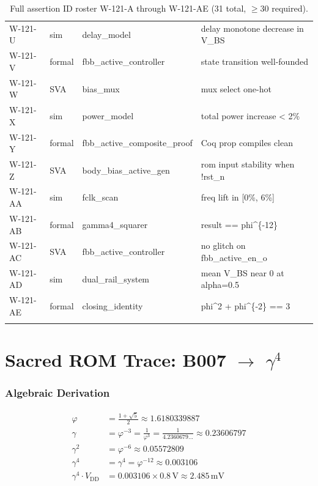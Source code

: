 \documentclass[12pt,a4paper]{report}
\theoremstyle{plain}
\theoremstyle{definition}
\theoremstyle{remark}
\newcommand{\vdd}{V_{\mathrm{DD}}}
\newcommand{\gammaFour}{\gamma^{4}}
\begin{document}
\begin{longtable}{lllp{7cm}}
W-121-U  & sim    & delay\_model               & delay monotone decrease in V\_BS \\
W-121-V  & formal & fbb\_active\_controller    & state transition well-founded \\
W-121-W  & SVA    & bias\_mux                  & mux select one-hot \\
W-121-X  & sim    & power\_model               & total power increase < 2\% \\
W-121-Y  & formal & fbb\_active\_composite\_proof & Coq prop compiles clean \\
W-121-Z  & SVA    & body\_bias\_active\_gen    & rom input stability when !rst\_n \\
W-121-AA & sim    & fclk\_scan                 & freq lift in [0\%, 6\%] \\
W-121-AB & formal & gamma4\_squarer            & result == phi\^{}\{-12\} \\
W-121-AC & SVA    & fbb\_active\_controller    & no glitch on fbb\_active\_en\_o \\
W-121-AD & sim    & dual\_rail\_system         & mean V\_BS near 0 at alpha=0.5 \\
W-121-AE & formal & closing\_identity          & phi\^{}2 + phi\^{}\{-2\} == 3 \\
\bottomrule
\caption{Full assertion ID roster W-121-A through W-121-AE (31 total, $\geq 30$ required).}
\label{tab:assertion_ids}
\end{longtable}

\chapter{Sacred ROM Trace: B007 $\to$ $\gammaFour$}
\label{app:rom_trace}

\subsection{Algebraic Derivation}

\begin{align}
  \varphi &= \frac{1 + \sqrt{5}}{2} \approx 1.6180339887 \\
  \gamma &= \varphi^{-3} = \frac{1}{\varphi^{3}} = \frac{1}{4.2360679...} \approx 0.23606797 \\
  \gamma^{2} &= \varphi^{-6} \approx 0.05572809 \\
  \gammaFour &= \gamma^{4} = \varphi^{-12} \approx 0.003106 \\
  \gammaFour \cdot \vdd &= 0.003106 \times 0.8\,\mathrm{V} \approx 2.485\,\mathrm{mV}
\end{align}
\end{document}
